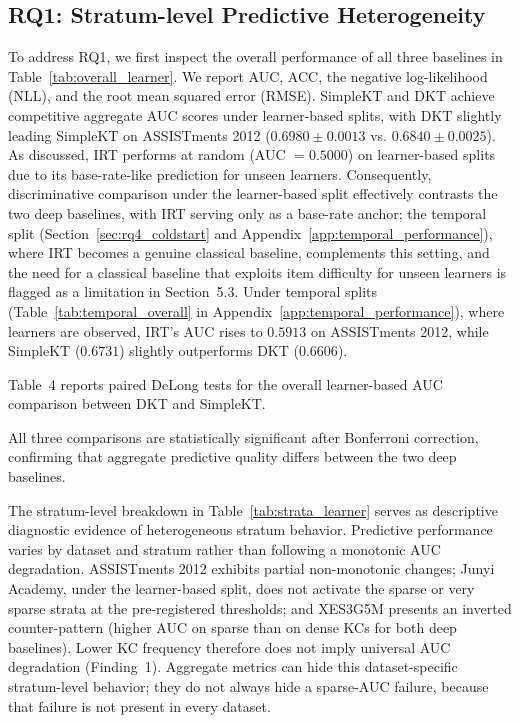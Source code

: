 \subsection{RQ1: Stratum-level Predictive Heterogeneity}
To address RQ1, we first inspect the overall performance of all three baselines in Table~\ref{tab:overall_learner}. We report AUC, ACC, the negative log-likelihood (NLL), and the root mean squared error (RMSE). SimpleKT and DKT achieve competitive aggregate AUC scores under learner-based splits, with DKT slightly leading SimpleKT on ASSISTments 2012 ($0.6980 \pm 0.0013$ vs. $0.6840 \pm 0.0025$). As discussed, IRT performs at random (AUC $= 0.5000$) on learner-based splits due to its base-rate-like prediction for unseen learners. Consequently, discriminative comparison under the learner-based split effectively contrasts the two deep baselines, with IRT serving only as a base-rate anchor; the temporal split (Section~\ref{sec:rq4_coldstart} and Appendix~\ref{app:temporal_performance}), where IRT becomes a genuine classical baseline, complements this setting, and the need for a classical baseline that exploits item difficulty for unseen learners is flagged as a limitation in Section~5.3. Under temporal splits (Table~\ref{tab:temporal_overall} in Appendix~\ref{app:temporal_performance}), where learners are observed, IRT's AUC rises to $0.5913$ on ASSISTments 2012, while SimpleKT ($0.6731$) slightly outperforms DKT ($0.6606$).





Table~4 reports paired DeLong tests for the overall learner-based AUC comparison between DKT and SimpleKT.

All three comparisons are statistically significant after Bonferroni correction, confirming that aggregate predictive quality differs between the two deep baselines.

The stratum-level breakdown in Table~\ref{tab:strata_learner} serves as descriptive diagnostic evidence of heterogeneous stratum behavior. Predictive performance varies by dataset and stratum rather than following a monotonic AUC degradation. ASSISTments 2012 exhibits partial non-monotonic changes; Junyi Academy, under the learner-based split, does not activate the sparse or very sparse strata at the pre-registered thresholds; and XES3G5M presents an inverted counter-pattern (higher AUC on sparse than on dense KCs for both deep baselines). Lower KC frequency therefore does not imply universal AUC degradation (Finding~1). Aggregate metrics can hide this dataset-specific stratum-level behavior; they do not always hide a sparse-AUC failure, because that failure is not present in every dataset.

